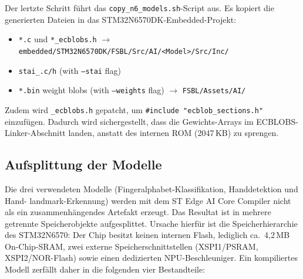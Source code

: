 Der lertzte Schritt führt das \texttt{copy\_n6\_models.sh}-Script aus. Es kopiert die generierten Dateien in das STM32N6570DK-Embedded-Projekt:
\begin{itemize}
    \item \texttt{*.c} und \texttt{*\_ecblobs.h} $\rightarrow$ \texttt{embedded/STM32N6570DK/FSBL/Src/AI/\textless Model\textgreater/Src/Inc/}
    \item \texttt{stai\_\*.c/h} (with \texttt{--stai} flag)
    \item \texttt{*.bin} weight blobs (with \texttt{--weights} flag) $\rightarrow$ \texttt{FSBL/Assets/AI/}
\end{itemize}

Zudem wird \texttt{\*\_ecblobs.h} gepatcht, um \verb|#include "ecblob_sections.h"| einzufügen. Dadurch wird sichergestellt, dass die Gewichts-Arrays im ECBLOBS-Linker-Abschnitt landen, anstatt des internen ROM (2047\,KB) zu sprengen.

\subsection{Aufsplittung der Modelle}\label{sub:modell-aufsplittung}

Die drei verwendeten Modelle (Fingeralphabet-Klassifikation, Handdetektion und
Hand- \linebreak landmark-Erkennung) werden mit dem ST Edge AI Core Compiler nicht als ein zusammenhängendes Artefakt erzeugt. Das Resultat ist in mehrere getrennte Speicherobjekte aufgesplittet. Ursache hierfür ist die Speicherhierarchie des STM32N6570: Der Chip besitzt keinen internen Flash, lediglich ca.\ 4{,}2\,MB On-Chip-SRAM, zwei externe Speicherschnittstellen
(XSPI1/PSRAM, XSPI2/NOR-Flash) sowie einen dedizierten NPU-Beschleuniger.
Ein kompiliertes Modell zerfällt daher in die folgenden vier Bestandteile:

